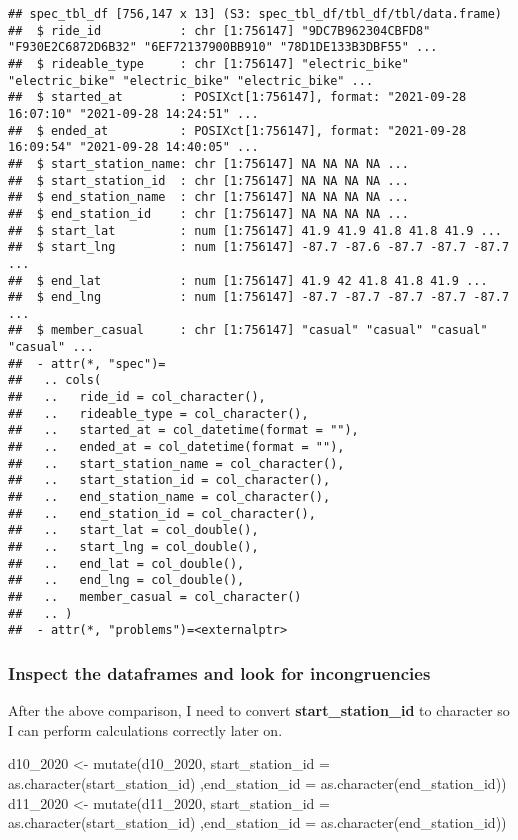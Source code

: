 \documentclass[
]{article}
\newenvironment{Shaded}{\begin{snugshade}}{\end{snugshade}}
\newcommand{\AttributeTok}[1]{\textcolor[rgb]{0.77,0.63,0.00}{#1}}
\newcommand{\FunctionTok}[1]{\textcolor[rgb]{0.00,0.00,0.00}{#1}}
\newcommand{\NormalTok}[1]{#1}
\newcommand{\OtherTok}[1]{\textcolor[rgb]{0.56,0.35,0.01}{#1}}
\begin{document}
\begin{verbatim}
## spec_tbl_df [756,147 x 13] (S3: spec_tbl_df/tbl_df/tbl/data.frame)
##  $ ride_id           : chr [1:756147] "9DC7B962304CBFD8" "F930E2C6872D6B32" "6EF72137900BB910" "78D1DE133B3DBF55" ...
##  $ rideable_type     : chr [1:756147] "electric_bike" "electric_bike" "electric_bike" "electric_bike" ...
##  $ started_at        : POSIXct[1:756147], format: "2021-09-28 16:07:10" "2021-09-28 14:24:51" ...
##  $ ended_at          : POSIXct[1:756147], format: "2021-09-28 16:09:54" "2021-09-28 14:40:05" ...
##  $ start_station_name: chr [1:756147] NA NA NA NA ...
##  $ start_station_id  : chr [1:756147] NA NA NA NA ...
##  $ end_station_name  : chr [1:756147] NA NA NA NA ...
##  $ end_station_id    : chr [1:756147] NA NA NA NA ...
##  $ start_lat         : num [1:756147] 41.9 41.9 41.8 41.8 41.9 ...
##  $ start_lng         : num [1:756147] -87.7 -87.6 -87.7 -87.7 -87.7 ...
##  $ end_lat           : num [1:756147] 41.9 42 41.8 41.8 41.9 ...
##  $ end_lng           : num [1:756147] -87.7 -87.7 -87.7 -87.7 -87.7 ...
##  $ member_casual     : chr [1:756147] "casual" "casual" "casual" "casual" ...
##  - attr(*, "spec")=
##   .. cols(
##   ..   ride_id = col_character(),
##   ..   rideable_type = col_character(),
##   ..   started_at = col_datetime(format = ""),
##   ..   ended_at = col_datetime(format = ""),
##   ..   start_station_name = col_character(),
##   ..   start_station_id = col_character(),
##   ..   end_station_name = col_character(),
##   ..   end_station_id = col_character(),
##   ..   start_lat = col_double(),
##   ..   start_lng = col_double(),
##   ..   end_lat = col_double(),
##   ..   end_lng = col_double(),
##   ..   member_casual = col_character()
##   .. )
##  - attr(*, "problems")=<externalptr>
\end{verbatim}

\hypertarget{inspect-the-dataframes-and-look-for-incongruencies-1}{%
\subsubsection{Inspect the dataframes and look for
incongruencies}\label{inspect-the-dataframes-and-look-for-incongruencies-1}}

After the above comparison, I need to convert
\textbf{start\_station\_id} to character so I can perform calculations
correctly later on.

\begin{Shaded}
\begin{Highlighting}[]
\NormalTok{d10\_2020 }\OtherTok{\textless{}{-}}  \FunctionTok{mutate}\NormalTok{(d10\_2020, }\AttributeTok{start\_station\_id =} \FunctionTok{as.character}\NormalTok{(start\_station\_id) }
\NormalTok{                            ,}\AttributeTok{end\_station\_id =} \FunctionTok{as.character}\NormalTok{(end\_station\_id))}
\NormalTok{d11\_2020 }\OtherTok{\textless{}{-}}  \FunctionTok{mutate}\NormalTok{(d11\_2020, }\AttributeTok{start\_station\_id =} \FunctionTok{as.character}\NormalTok{(start\_station\_id)}
\NormalTok{                            ,}\AttributeTok{end\_station\_id =} \FunctionTok{as.character}\NormalTok{(end\_station\_id))}
\end{Highlighting}
\end{Shaded}
\end{document}
